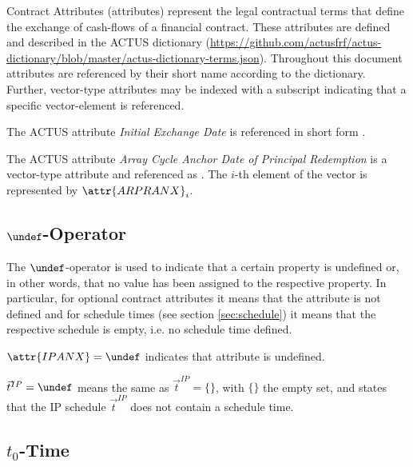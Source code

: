 Contract Attributes (attributes) represent the legal contractual terms that define the exchange of cash-flows of a financial contract. These attributes are defined and described in the ACTUS dictionary (\url{https://github.com/actusfrf/actus-dictionary/blob/master/actus-dictionary-terms.json}). Throughout this document attributes are referenced by their short name according to the dictionary. Further, vector-type attributes may be indexed with a subscript indicating that a specific vector-element is referenced.

\begin{example}
The ACTUS attribute \textit{Initial Exchange Date} is referenced in short form .
\end{example}


\begin{example}
The ACTUS attribute \textit{Array Cycle Anchor Date of Principal Redemption} is a vector-type attribute and referenced as . The $i$-th element of the vector is represented by $\attr{ARPRANX}_i$.
\end{example}


\subsection{$\undef$-Operator}\label{sec:undef}

The $\undef$-operator is used to indicate that a certain property is undefined or, in other words, that no value has been assigned to the respective property. In particular, for optional contract attributes it means that the attribute is not defined and for schedule times (see section \ref{sec:schedule}) it means that the respective schedule is empty, i.e. no schedule time defined.

\begin{example}
$\attr{IPANX}=\undef$ indicates that attribute  is undefined.
\end{example}

\begin{example}
$\vec{t}^{IP}=\undef$ means the same as $\vec{t}^{IP}=\{\}$, with $\{\}$ the empty set, and states that the IP schedule $\vec{t}^{IP}$ does not contain a schedule time.
\end{example}


\subsection{$t_0$-Time}\label{sec:t0time}

